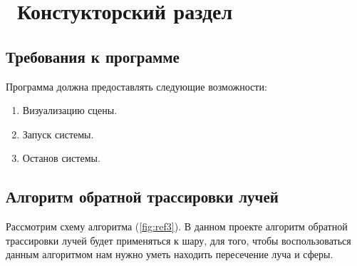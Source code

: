 \chapter{ Констукторский раздел}
\label{cha:design}

\section{Требования к программе}

Программа должна предоставлять следующие возможности:
\begin{enumerate}
	\item Визуализацию сцены.
	\item Запуск системы.
	\item Останов системы.
\end{enumerate}

\section{Алгоритм обратной трассировки лучей}

Рассмотрим схему алгоритма (\ref{fig:ref3}). В данном проекте алгоритм обратной трассировки лучей будет применяться к шару, для того, чтобы воспользоваться данным алгоритмом нам нужно уметь находить пересечение луча и сферы.

\begin{figure}[ht!]
\end{figure}

